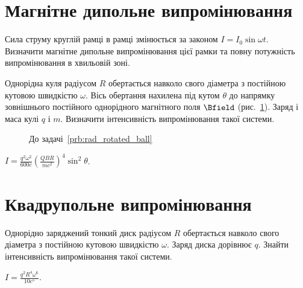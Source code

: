 \section{Магнітне дипольне випромінювання}

\begin{problem}
Сила струму круглій рамці в рамці змінюється за законом $I = I_0 \sin\omega t$. Визначити магнітне дипольне випромінювання цієї рамки та повну потужність випромінювання в хвильовій зоні.
%	
\end{problem}

\begin{problem}\label{prb:rad_rotated_ball}
Однорідна куля радіусом $R$ обертається навколо свого діаметра з постійною кутовою швидкістю $\omega$. Вісь обертання нахилена під кутом $\theta$ до напрямку зовнішнього постійного однорідного
магнітного поля $\Bfield$ (рис.~\ref{rad_rotated_ball}). Заряд і маса кулі $q$ і $m$. Визначити інтенсивність випромінювання такої системи.
\begin{figure}[h!]\centering
	\caption{До задачі~\ref{prb:rad_rotated_ball}}
	\label{rad_rotated_ball}
\end{figure}

\begin{solution}
	$I = \frac{q^2\omega^2}{600c} \left( \frac{QBR}{mc^2}\right)^4 \sin^2\theta $.
\end{solution}
\end{problem}

\section{Квадрупольне випромінювання}

\begin{problem}\label{prb:rad_rotated_disk}
Однорідно заряджений тонкий диск радіусом $R$ обертається навколо свого діаметра з постійною кутовою швидкістю $\omega$. Заряд диска дорівнює $q$. Знайти інтенсивність випромінювання такої системи.
\begin{solution}
	$I = \frac{q^2R^4\omega^6}{10c^5} $.
\end{solution}
\end{problem}


